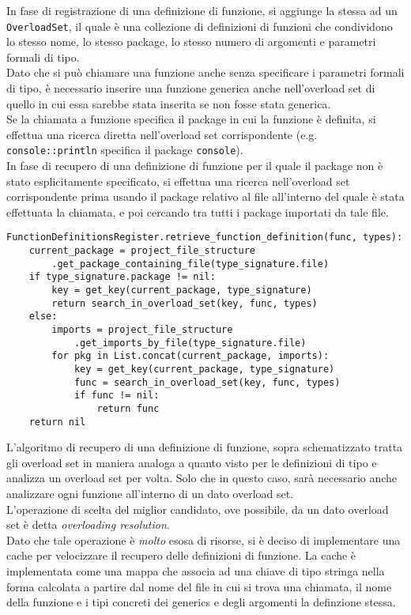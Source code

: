 In fase di registrazione di una definizione di funzione, si aggiunge la stessa ad un \texttt{OverloadSet}, 
il quale è una collezione di definizioni di funzioni che condividono lo stesso nome, lo stesso package, lo stesso numero di argomenti e 
parametri formali di tipo. \\

Dato che si può chiamare una funzione anche senza specificare i parametri formali di tipo, è necessario
inserire una funzione generica anche nell'overload set di quello in cui essa sarebbe stata inserita se non fosse 
stata generica. \\

Se la chiamata a funzione specifica il package in cui la funzione è definita, si effettua una ricerca diretta
nell'overload set corrispondente (e.g. \texttt{console::println} specifica il package \texttt{console}). \\

In fase di recupero di una definizione di funzione per il quale il package non è stato esplicitamente specificato, 
si effettua una ricerca nell'overload set corrispondente prima usando il package relativo al file all'interno del 
quale è stata effettuata la chiamata, e poi cercando tra tutti i package importati da tale file.

\vspace{0.5cm}
\begin{lstlisting}[frame=single]
FunctionDefinitionsRegister.retrieve_function_definition(func, types):
    current_package = project_file_structure
        .get_package_containing_file(type_signature.file)
    if type_signature.package != nil:
        key = get_key(current_package, type_signature)
        return search_in_overload_set(key, func, types)
    else:
        imports = project_file_structure
            .get_imports_by_file(type_signature.file)
        for pkg in List.concat(current_package, imports):
            key = get_key(current_package, type_signature)
            func = search_in_overload_set(key, func, types)
            if func != nil:
                return func
    return nil
\end{lstlisting}
\vspace{0.5cm}

L'algoritmo di recupero di una definizione di funzione, sopra schematizzato tratta gli overload set in 
maniera analoga a quanto visto per le definizioni di tipo e analizza un overload set per volta. Solo che 
in questo caso, sarà necessario anche analizzare ogni funzione all'interno di un dato overload set. \\

L'operazione di scelta del miglior candidato, ove possibile, da un dato overload set è detta \textit{overloading resolution}. \\

Dato che tale operazione è \textit{molto} esosa di risorse, si è deciso di implementare una cache per velocizzare
il recupero delle definizioni di funzione. La cache è implementata come una mappa che associa ad una 
chiave di tipo stringa nella forma calcolata a partire dal nome del file in cui si trova una chiamata, il nome 
della funzione e i tipi concreti dei generics e degli argomenti la definzione stessa. \\